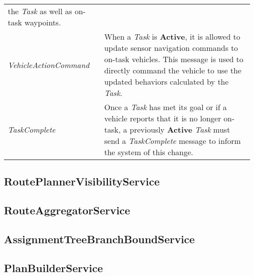 \begin{longtable}[c]{@{}ll@{}}
\begin{minipage}[t]{0.65\columnwidth}
the \emph{Task} as well as on-task waypoints.
\strut\end{minipage}\tabularnewline
\begin{minipage}[t]{0.29\columnwidth}\raggedright\strut
\emph{VehicleActionCommand}
\strut\end{minipage} &
\begin{minipage}[t]{0.65\columnwidth}\raggedright\strut
When a \emph{Task} is \textbf{Active}, it is allowed to update sensor
navigation commands to on-task vehicles. This message is used to
directly command the vehicle to use the updated behaviors calculated by
the \emph{Task}.
\strut\end{minipage}\tabularnewline
\begin{minipage}[t]{0.29\columnwidth}\raggedright\strut
\emph{TaskComplete}
\strut\end{minipage} &
\begin{minipage}[t]{0.65\columnwidth}\raggedright\strut
Once a \emph{Task} has met its goal or if a vehicle reports that it is
no longer on-task, a previously \textbf{Active} \emph{Task} must send a
\emph{TaskComplete} message to inform the system of this change.
\strut\end{minipage}\tabularnewline
\bottomrule
\end{longtable}

\subsection{RoutePlannerVisibilityService}\label{routeplannervisibilityservice}

\subsection{RouteAggregatorService}\label{routeaggregatorservice}

\subsection{AssignmentTreeBranchBoundService}\label{assignmenttreebranchboundservice}

\subsection{PlanBuilderService}\label{planbuilderservice}


